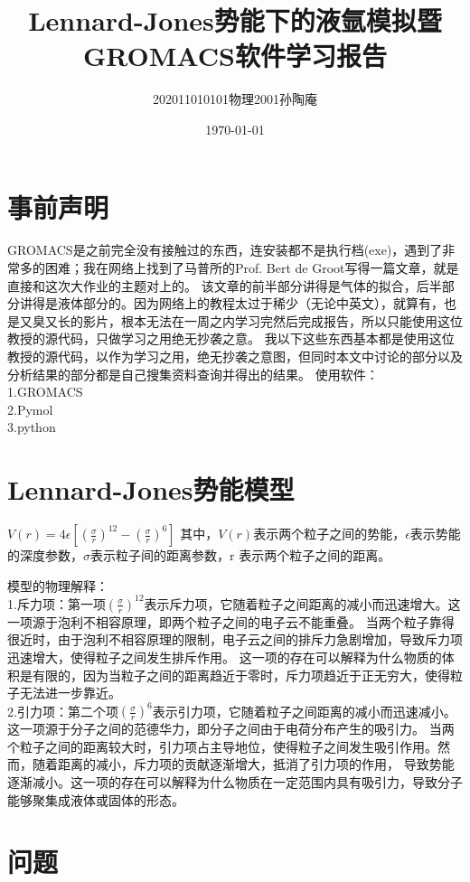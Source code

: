 \documentclass[12pt, a4paper, oneside]{ctexart}
\title{Lennard-Jones势能下的液氩模拟暨GROMACS软件学习报告}
\date{\today}
\author{202011010101物理2001孙陶庵}
\begin{document}
\begin{spacing}{2.0}
\tableofcontents
\maketitle
\section{事前声明}
GROMACS是之前完全没有接触过的东西，连安装都不是执行档(exe)，遇到了非常多的困难；我在网络上找到了马普所的Prof. Bert de Groot写得一篇文章\cite{NBS_2021}，就是直接和这次大作业的主题对上的。
该文章的前半部分讲得是气体的拟合，后半部分讲得是液体部分的。因为网络上的教程太过于稀少（无论中英文），就算有，也是又臭又长的影片，根本无法在一周之内学习完然后完成报告，所以只能使用这位教授的源代码，只做学习之用绝无抄袭之意。
我以下这些东西基本都是使用这位教授的源代码，以作为学习之用，绝无抄袭之意图，但同时本文中讨论的部分以及分析结果的部分都是自己搜集资料查询并得出的结果。
使用软件：\\
1.GROMACS\\
2.Pymol\\
3.python
\section{Lennard-Jones势能模型}
$V(r)=4\epsilon\left[\left(\frac{\sigma}{r}\right)^{12}-\left(\frac{\sigma}{r}\right)^6\right]$
其中，$V(r) $表示两个粒子之间的势能，$\epsilon$表示势能的深度参数，$\sigma$表示粒子间的距离参数，r 表示两个粒子之间的距离。

模型的物理解释：
\\
1.斥力项：第一项$\left(\frac{\sigma}{r}\right)^{12}$表示斥力项，它随着粒子之间距离的减小而迅速增大。这一项源于泡利不相容原理，即两个粒子之间的电子云不能重叠。
当两个粒子靠得很近时，由于泡利不相容原理的限制，电子云之间的排斥力急剧增加，导致斥力项迅速增大，使得粒子之间发生排斥作用。
这一项的存在可以解释为什么物质的体积是有限的，因为当粒子之间的距离趋近于零时，斥力项趋近于正无穷大，使得粒子无法进一步靠近。\\
2.引力项：第二个项$\left(\frac{\sigma}{r}\right)^6$表示引力项，它随着粒子之间距离的减小而迅速减小。这一项源于分子之间的范德华力，即分子之间由于电荷分布产生的吸引力。
当两个粒子之间的距离较大时，引力项占主导地位，使得粒子之间发生吸引作用。然而，随着距离的减小，斥力项的贡献逐渐增大，抵消了引力项的作用，
导致势能逐渐减小。这一项的存在可以解释为什么物质在一定范围内具有吸引力，导致分子能够聚集成液体或固体的形态。

\section{问题}


\end{spacing}
\end{document}

